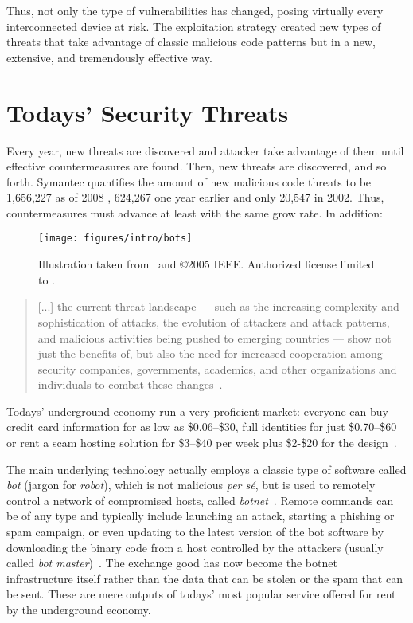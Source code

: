 Thus, not only the type of vulnerabilities has changed, posing
virtually every interconnected device at risk. The exploitation
strategy created new types of threats that take advantage of classic
malicious code patterns but in a new, extensive, and tremendously
effective way.

\section{Todays' Security Threats}
\label{introduction:motivation} Every year, new threats are discovered
and attacker take advantage of them until effective countermeasures
are found. Then, new threats are discovered, and so
forth. \textsf{Symantec} quantifies the amount of new malicious code
threats to be 1,656,227 as of 2008
\citep{symantec_threat_report_2009}, 624,267 one year earlier and only
20,547 in 2002. Thus, countermeasures must advance at least with the
same grow rate. In addition:

\begin{figure}[t]
  \centering
  \texttt{[image: figures/intro/bots]}
  \caption{Illustration taken from~\citep{holz} and \copyright 2005
  IEEE. Authorized license limited to \polimi.}
  \label{fig:bots}
\end{figure}

\begin{quotation}
  [...] the current threat landscape --- such as the increasing
  complexity and sophistication of attacks, the evolution of attackers
  and attack patterns, and malicious activities being pushed to
  emerging countries --- show not just the benefits of, but also the
  need for increased cooperation among security companies,
  governments, academics, and other organizations and individuals to
  combat these changes~\citep{symantec_threat_report_2009}.
\end{quotation}

Todays' underground economy run a very proficient market: everyone can
buy credit card information for as low as \$0.06--\$30, full
identities for just \$0.70--\$60 or rent a scam hosting solution for
\$3--\$40 per week plus \$2-\$20 for the
design~\citep{symantec_threat_report_2009}.

The main underlying technology actually employs a classic type of
software called \emph{bot} (jargon for \emph{robot}), which is not
malicious \emph{per s\'e}, but is used to remotely control a network
of compromised hosts, called \emph{botnet}~\citep{holz}. Remote
commands can be of any type and typically include launching an attack,
starting a phishing or spam campaign, or even updating to the latest
version of the bot software by downloading the binary code from a host
controlled by the attackers (usually called \emph{bot
master})~\citep{torpig}. The exchange good has now become the botnet
infrastructure itself rather than the data that can be stolen or the
spam that can be sent. These are mere outputs of todays' most popular
service offered for rent by the underground economy.

